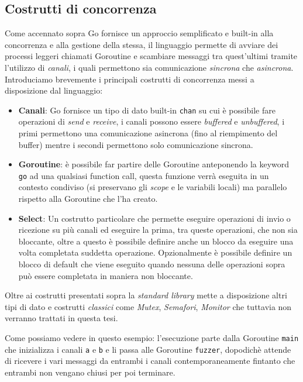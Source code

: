 \subsection{Costrutti di concorrenza}
Come accennato sopra Go fornisce un approccio semplificato e built-in alla concorrenza e alla gestione della stessa, il linguaggio permette di avviare dei processi leggeri chiamati Goroutine e scambiare messaggi tra quest'ultimi tramite l'utilizzo di \emph{canali}, i quali permettono sia comunicazione \emph{sincrona} che \emph{asincrona}.\\
Introduciamo brevemente i principali costrutti di concorrenza messi a disposizione dal linguaggio:
\begin{itemize}
    \item \textbf{Canali}: Go fornisce un tipo di dato built-in \texttt{chan} su cui è possibile fare operazioni di \emph{send} e \emph{receive}, i canali possono essere \emph{buffered} e \emph{unbuffered}, i primi permettono una comunicazione asincrona (fino al riempimento del buffer) mentre i secondi permettono solo comunicazione sincrona.
    \item \textbf{Goroutine}: è possibile far partire delle Goroutine anteponendo la keyword \texttt{go} ad una qualsiasi function call, questa funzione verrà eseguita in un contesto condiviso (si preservano gli \emph{scope} e le variabili locali) ma parallelo rispetto alla Goroutine che l'ha creato.
    \item \textbf{Select}: Un costrutto particolare che permette eseguire operazioni di invio o ricezione su più canali ed eseguire la prima, tra queste operazioni, che non sia bloccante, oltre a questo è possibile definire anche un blocco da eseguire una volta completata suddetta operazione. Opzionalmente è possibile definire un blocco di default che viene eseguito quando nessuna delle operazioni sopra può essere completata in maniera non bloccante.
\end{itemize}
Oltre ai costrutti presentati sopra la \emph{standard library} mette a disposizione altri tipi di dato e costrutti \emph{classici} come \emph{Mutex}, \emph{Semafori}, \emph{Monitor} che tuttavia non verranno trattati in questa tesi.
\newpage %

\bigskip
Come possiamo vedere in questo esempio: l'esecuzione parte dalla Goroutine \texttt{main} che inizializza i canali \texttt{a} e \texttt{b} e li passa alle Goroutine \texttt{fuzzer}, dopodichè attende di ricevere i vari messaggi da entrambi i canali contemporaneamente fintanto che entrambi non vengano chiusi per poi terminare.

